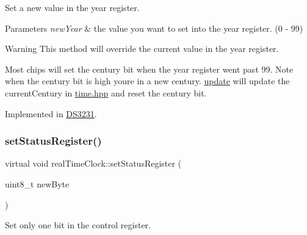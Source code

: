 Set a new value in the year register. 


\begin{DoxyParams}{Parameters}
{\em new\+Year} & the value you want to set into the year register. (0 -\/ 99) \\
\hline
\end{DoxyParams}
\begin{DoxyWarning}{Warning}
This method will override the current value in the year register. 

Most chips will set the century bit when the year register went past 99. Note when the century bit is high you\textquotesingle{}re in a new century. \mbox{\hyperlink{classreal_time_clock_afb5132ca3cbe80552a88041cead0a2b3}{update}} will update the current\+Century in \mbox{\hyperlink{time_8hpp_source}{time.\+hpp}} and reset the century bit. 
\end{DoxyWarning}


Implemented in \mbox{\hyperlink{class_d_s3231_a59a60a725581bc8e5dcf857ea52c6281}{D\+S3231}}.

\mbox{\label{classreal_time_clock_aa8ee80a7056c67543834508d0f04a218}} 
\subsubsection{\texorpdfstring{set\+Status\+Register()}{setStatusRegister()}}
{\footnotesize\ttfamily virtual void real\+Time\+Clock\+::set\+Status\+Register (\begin{DoxyParamCaption}\item[{uint8\+\_\+t}]{new\+Byte }\end{DoxyParamCaption})\hspace{0.3cm}{\ttfamily [pure virtual]}}



Set only one bit in the control register. 


